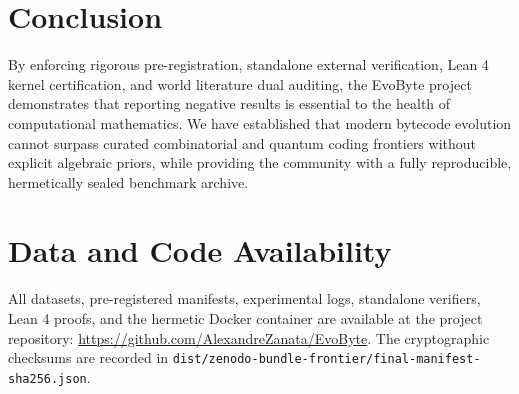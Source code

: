 \documentclass[11pt,a4paper]{article}
\begin{document}
\section{Conclusion}
\label{sec:conclusion}
By enforcing rigorous pre-registration, standalone external verification, Lean 4 kernel certification, and world literature dual auditing, the EvoByte project demonstrates that reporting negative results is essential to the health of computational mathematics. We have established that modern bytecode evolution cannot surpass curated combinatorial and quantum coding frontiers without explicit algebraic priors, while providing the community with a fully reproducible, hermetically sealed benchmark archive.

\section*{Data and Code Availability}
All datasets, pre-registered manifests, experimental logs, standalone verifiers, Lean 4 proofs, and the hermetic Docker container are available at the project repository: \url{https://github.com/AlexandreZanata/EvoByte}. The cryptographic checksums are recorded in \texttt{dist/zenodo-bundle-frontier/final-manifest-sha256.json}.



\end{document}
